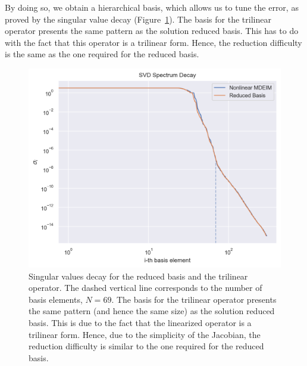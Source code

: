 \documentclass[../../thesis.tex]{subfiles}
\begin{document}
By doing so, we obtain a hierarchical basis, which allows us to tune the error,
as proved by the singular value decay (Figure~\ref{fig:sigmas_decay_from_fom}).
The basis for the trilinear operator presents the same pattern 
as the solution reduced basis.
This has to do with the fact that this operator is a trilinear form.
Hence, the reduction difficulty is the same as the one
required for the reduced basis.
\begin{figure}[h]
    \centering
    \includegraphics[width=1\columnwidth]{research_project/piston/figures/mdeim_certification/sigmas_problem_from_fom.png}
    \caption{Singular values decay for the reduced basis and the trilinear operator.
    The dashed vertical line corresponds to the number of basis elements, $N=69$.
    The basis for the trilinear operator presents the same pattern 
    (and hence the same size)
    as the solution reduced basis.
    This is due to the fact that the linearized operator is a trilinear form.
    Hence, due to the simplicity of the Jacobian, the reduction difficulty is similar to the one
    required for the reduced basis.}
    \label{fig:sigmas_decay_from_fom}
\end{figure}
\end{document}
